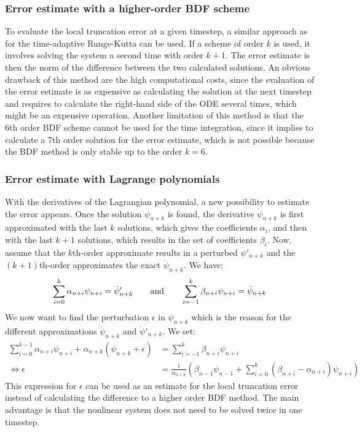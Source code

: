 \subsubsection{Error estimate with a higher-order BDF scheme}
\label{sssec:errorEstimateBDFEmbeddedScheme}
To evaluate the local truncation error at a given timestep, a similar approach as for the time-adaptive Runge-Kutta can be used. If a scheme of order $k$ is used, it involves solving the system a second time with order $k+1$. The error estimate is then the norm of the difference between the two calculated solutions. An obvious drawback of this method are the high computational costs, since the evaluation of the error estimate is as expensive as calculating the solution at the next timestep and requires to calculate the right-hand side of the ODE several times, which might be an expensive operation. Another limitation of this method is that the 6th order BDF scheme cannot be used for the time integration, since it implies to calculate a 7th order solution for the error estimate, which is not possible because the BDF method is only stable up to the order $k=6$. 

\subsubsection{Error estimate with Lagrange polynomials}
\label{sssec:errorEstimateBDFLagrange}
With the derivatives of the Lagrangian polynomial, a new possibility to estimate the error appears. Once the solution $\psi_{n+k}$ is found, the derivative $\dot{\psi}_{n+k}$ is first approximated with the last $k$ solutions, which gives the coefficients $\alpha_i$, and then with the last $k+1$ solutions, which results in the set of coefficients $\beta_i$. Now, assume that the $k$th-order approximate results in a perturbed $\dot{\psi}'_{n+k}$ and the $(k+1)$th-order approximates the exact $\dot{\psi}_{n+k}$. We have:
\begin{equation}
	\sum_{i=0}^{k}\alpha_{n+i}\psi_{n+i} = \dot{\psi}'_{n+k} \qquad \text{and}\qquad \sum_{i=-1}^{k}\beta_{n+i}\psi_{n+i} = \dot{\psi}_{n+k} \\
\end{equation}
We now want to find the perturbation $\epsilon$ in $\psi_{n+k}$ which is the reason for the different approximations $\dot{\psi}_{n+k}$ and $\dot{\psi}'_{n+k}$. We set:
\begin{align}
	\sum_{i=0}^{k-1}\alpha_{n+i}\psi_{n+i} + \alpha_{n+k}(\psi_{n+k} + \epsilon) &= \sum_{i=-1}^{k}\beta_{n+i}\psi_{n+i} \\
	\Leftrightarrow
	\epsilon &= \frac{1}{\alpha_{n+k}}\left(\beta_{n-1}\psi_{n-1} + \sum_{i=0}^{k}(\beta_{n+i}-\alpha_{n+i})\psi_{n+i}\right)
\end{align}
This expression for $\epsilon$ can be used as an estimate for the local truncation error instead of calculating the difference to a higher order BDF method. The main advantage is that the nonlinear system does not need to be solved twice in one timestep.

